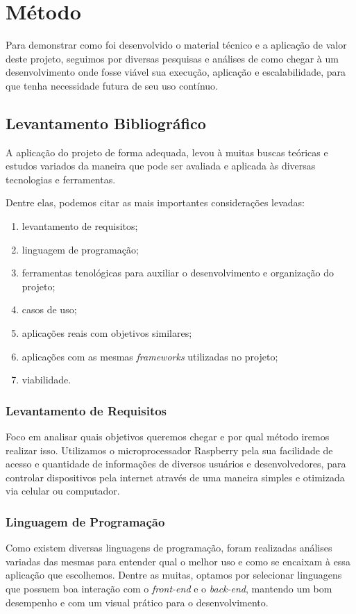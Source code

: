 \documentclass[../../layout.tex]{subfiles}
\begin{document}
\chapter{Método}
Para demonstrar como foi desenvolvido o material técnico e a aplicação de valor deste projeto, seguimos por diversas pesquisas e análises de como chegar à um desenvolvimento onde fosse viável sua execução, aplicação e escalabilidade, para que tenha necessidade futura de seu uso contínuo.

\section{Levantamento Bibliográfico}
A aplicação do projeto de forma adequada, levou à muitas buscas teóricas e estudos variados da maneira que pode ser avaliada e aplicada às diversas tecnologias e ferramentas.\par
Dentre elas, podemos citar as mais importantes considerações levadas:

\begin{enumerate}[label=\alph*)]
\itemsep0em
	\item levantamento de requisitos;
	\item linguagem de programação;
	\item ferramentas tenológicas para auxiliar o desenvolvimento e organização do projeto;
	\item casos de uso;
	\item aplicações reais com objetivos similares;
	\item aplicações com as mesmas \emph{frameworks} utilizadas no projeto;
	\item viabilidade.
\end{enumerate}

\subsection{Levantamento de Requisitos}
Foco em analisar quais objetivos queremos chegar e por qual método iremos realizar isso. Utilizamos o microprocessador Raspberry pela sua facilidade de acesso e quantidade de informações de diversos usuários e desenvolvedores, para controlar dispositivos pela internet através de uma maneira simples e otimizada via celular ou computador.

\subsection{Linguagem de Programação}
Como existem diversas linguagens de programação, foram realizadas análises variadas das mesmas para entender qual o melhor uso e como se encaixam à essa aplicação que escolhemos. Dentre as muitas, optamos por selecionar linguagens que possuem boa interação com o \emph{front-end} e o \emph{back-end}, mantendo um bom desempenho e com um visual prático para o desenvolvimento.
\end{document}
